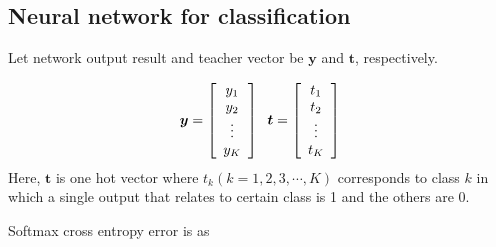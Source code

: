 \documentclass[a4paper,12pt]{article}
\begin{document}
\subsection{Neural network for classification}

Let network output result and teacher vector be ${\bm y}$ and ${\bm t}$, respectively.

\begin{align}
{\bm y}=\left[\begin{array}{ccc}
	y_1 \\
    y_2 \\
    \vdots \\
    y_K
    \end{array}\right]\hspace{0.2cm}
{\bm t}=\left[\begin{array}{ccc}
	t_1 \\
	t_2 \\
	\vdots \\
	t_K
	\end{array}\right]
\end{align}
Here, ${\bm t}$ is one hot vector where $t_k (k=1,2,3,\cdots,K)$ corresponds to class $k$ in which a single output that relates to certain class is 1 and the others are 0. \par

Softmax cross entropy error is as
\end{document}
